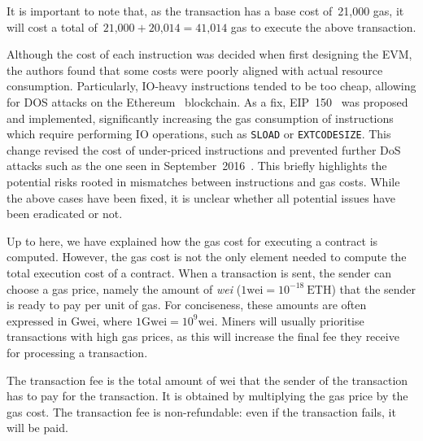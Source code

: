 It is important to note that, as the transaction has a base cost of~21,000 gas, it will cost a total of~$21\text{,}000 + 20\text{,}014 = 41\text{,}014$ gas to execute the above transaction.

Although the cost of each instruction was decided when first designing the EVM, the authors found that some costs were poorly aligned with actual resource consumption.
Particularly, IO-heavy instructions tended to be too cheap, allowing for DOS attacks on the Ethereum~\cite{suicide-attack} blockchain.
As a fix, EIP~150~\cite{erc150} was proposed and implemented, significantly increasing the gas consumption of instructions which require performing IO operations, such as \lstinline{SLOAD} or \lstinline{EXTCODESIZE}.
This change revised the cost of under-priced instructions and prevented further DoS attacks such as the one seen in September~2016~\cite{transaction-spam-attack}.
This briefly highlights the potential risks rooted in mismatches between instructions and gas costs.
While the above cases have been fixed, it is unclear whether all potential issues have been eradicated or not.

 Up to here, we have explained how the gas cost for executing a contract is computed.
However, the gas cost is not the only element needed to compute the total execution cost of a contract.
When a transaction is sent, the sender can choose a gas price, namely the amount of \emph{wei} ($1\text{wei} = 10^{-18}~\text{ETH}$) that the sender is ready to pay per unit of gas.
For conciseness, these amounts are often expressed in Gwei, where $1\text{Gwei} = 10^9\text{wei}$.
Miners will usually prioritise transactions with high gas prices, as this will increase the final fee they receive for processing a transaction.

The transaction fee is the total amount of wei that the sender of the transaction has to pay for the transaction.
It is obtained by multiplying the gas price by the gas cost.
The transaction fee is non-refundable: even if the transaction fails, it will be paid.

